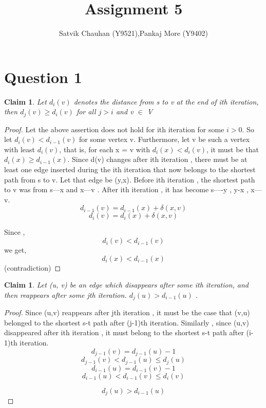 \documentclass[11pt]{article}
\title{Assignment 5}
\author{Satvik Chauhan (Y9521),Pankaj More (Y9402)}
\newtheorem{claim}[theorem]{Claim}
\begin{document}
\maketitle
\section*{Question 1}
\begin{claim}
Let $d_i(v)$ denotes the distance from s to v at the end of ith iteration, then 
$d_j(v) \geq d_i(v) $ for all $j > i$ and v $\in$ V 
\end{claim}
\begin{proof}
	Let the above assertion does not hold for ith iteration for some $i > 0$. So let $d_i(v) < d_{i-1}(v)$ for some
vertex v. Furthermore, let v be such a vertex with least $d_i(v)$, that is, for each x = v with $d_i(x) < d_i(v)$,
it must be that $d_i(x) \geq d_{i-1}(x)$. 
	Since d(v) changes after ith iteration , there must be at least one edge inserted during the ith iteration that now belongs to the shortest path from s to v.
	Let that edge be (y,x). Before ith iteration , the shortest path to v was from s---x and x---v .
	After ith iteration , it has become s----y , y-x , x---v. 
\[d_{i-1}(v) = d_{i-1}(x) + \delta(x,v) \]
\[d_{i}(v) = d_{i}(x) + \delta(x,v) \]

Since ,
\[d_i(v) < d_{i-1}(v) \]
we get,
\[d_i(x) < d_{i-1}(x) \] 
(contradiction)

\end{proof}
\pagebreak
\begin{claim}
Let (u, v) be an edge which disappears after some ith iteration, and then reappears after some jth iteration. 
$d_j(u) > d_{i-1}(u)$ . 
\end{claim}
\begin{proof}
Since (u,v) reappears after jth iteration , it must be the case that (v,u) belonged to the shortest s-t path after (j-1)th iteration. Similarly , since (u,v) disappeared after ith iteration , it must belong to the shortest s-t path after (i-1)th iteration.
\[d_{j-1}(v) = d_{j-1}(u) - 1 \]
\[d_{j-1}(v) < d_{j-1}(u) \leq d_j(u) \]
\[d_{i-1}(u) = d_{i-1}(v) - 1 \]
\[d_{i-1}(u) < d_{i-1}(v) \leq d_i(v) \]

\[d_j(u) > d_{i-1}(u) \]

 
\end{proof}
\end{document}
